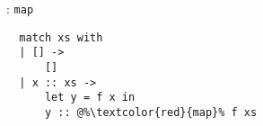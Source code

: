 
\begin{frame}[fragile]{\DataLang: \texttt{map}}
\begin{lstlisting}[basicstyle=\ttfamily\Large]
%\textcolor{red}{map}% |-> rec f xs =
  match xs with
  | [] ->
      []
  | x :: xs ->
      let y = f x in
      y :: @%\textcolor{red}{map}% f xs
\end{lstlisting}
\end{frame}